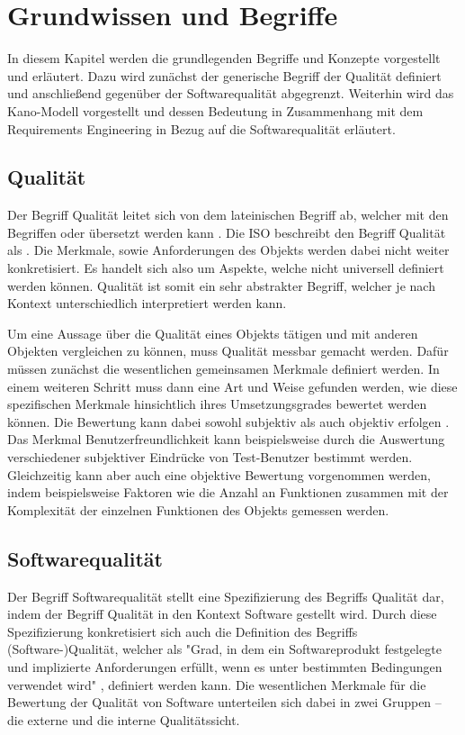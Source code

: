 \section{Grundwissen und Begriffe}
In diesem Kapitel werden die grundlegenden Begriffe und Konzepte vorgestellt und erläutert.
Dazu wird zunächst der generische Begriff der Qualität definiert und anschließend gegenüber der Softwarequalität abgegrenzt.
Weiterhin wird das Kano-Modell vorgestellt und dessen Bedeutung in Zusammenhang mit dem Requirements Engineering in Bezug auf die Softwarequalität erläutert.
\subsection{Qualität}
Der Begriff Qualität leitet sich von dem lateinischen Begriff  ab, welcher mit den Begriffen  oder  übersetzt werden kann \autocite[vgl.][]{noauthor_was_nodate}.
Die \ac{ISO} beschreibt den Begriff Qualität als  \autocite[S. 17]{iso_iso_2015}.
Die Merkmale, sowie Anforderungen des Objekts werden dabei nicht weiter konkretisiert.
Es handelt sich also um Aspekte, welche nicht universell definiert werden können.
Qualität ist somit ein sehr abstrakter Begriff, welcher je nach Kontext unterschiedlich interpretiert werden kann.

Um eine Aussage über die Qualität eines Objekts tätigen und mit anderen Objekten vergleichen zu können, muss Qualität messbar gemacht werden.
Dafür müssen zunächst die wesentlichen gemeinsamen Merkmale definiert werden.
In einem weiteren Schritt muss dann eine Art und Weise gefunden werden, wie diese spezifischen Merkmale hinsichtlich ihres Umsetzungsgrades bewertet werden können.
Die Bewertung kann dabei sowohl subjektiv als auch objektiv erfolgen \autocite[vgl.][S. 53]{shewhart_economic_1931}.
Das Merkmal Benutzerfreundlichkeit kann beispielsweise durch die Auswertung verschiedener subjektiver Eindrücke von Test-Benutzer bestimmt werden.
Gleichzeitig kann aber auch eine objektive Bewertung vorgenommen werden, indem beispielsweise Faktoren wie die Anzahl an Funktionen zusammen mit der Komplexität der einzelnen Funktionen des Objekts gemessen werden.

\subsection{Softwarequalität}\label{sec:SoftwareQualitaet}
Der Begriff Softwarequalität stellt eine Spezifizierung des Begriffs Qualität dar, indem der Begriff Qualität in den Kontext Software gestellt wird.
Durch diese Spezifizierung konkretisiert sich auch die Definition des Begriffs (Software-)Qualität, welcher als "Grad, in dem ein Softwareprodukt festgelegte und implizierte Anforderungen erfüllt, wenn es unter bestimmten Bedingungen verwendet wird" \autocite[S. 17]{iso_iso_2011}, definiert werden kann.
Die wesentlichen Merkmale für die Bewertung der Qualität von Software unterteilen sich dabei in zwei Gruppen -- die externe und die interne Qualitätssicht.

